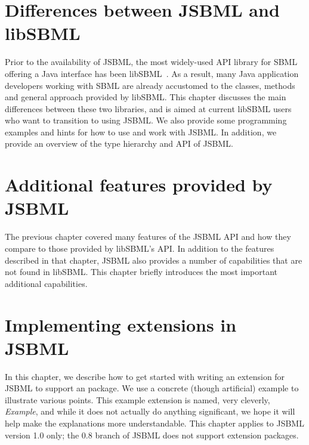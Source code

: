 \documentclass{JSBMLdoc}
\begin{document}





\chapter{Differences between JSBML and libSBML}
\label{chp:jsbml-libsbml-diffs}

Prior to the availability of JSBML, the most widely-used API library for
SBML offering a Java interface has been libSBML~\cite{Bornstein2008}. As a
result, many Java application developers working with SBML are already
accustomed to the classes, methods and general approach provided by
libSBML. This chapter discusses the main differences between these two
libraries, and is aimed at current libSBML users who want to transition to
using JSBML. We also provide some programming examples and hints for how
to use and work with JSBML. In addition, we provide an overview of the type hierarchy 
and API of JSBML.






\chapter{Additional features provided by JSBML}
\label{chp:additional-jsbml-features}

The previous chapter covered many features of the JSBML API and how they
compare to those provided by libSBML's API.  In addition to the features
described in that chapter, JSBML also provides a number of capabilities that
are not found in libSBML.  This chapter briefly introduces the most important
additional capabilities.










\chapter{Implementing extensions in JSBML}
\label{chp:howToExtension}

In this chapter, we describe how to get started with writing an extension
for JSBML to support an \SBMLthree package.  We use a concrete (though
artificial) example to illustrate various points.  This example extension
is named, very cleverly, \emph{Example}, and while it does not actually do
anything significant, we hope it will help make the explanations more
understandable. This chapter applies to JSBML version 1.0 only;
the 0.8 branch of JSBML does not support extension packages.
\end{document}
